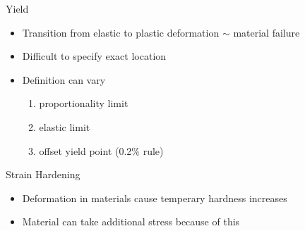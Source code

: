 \documentclass[10pt, svgnames]{beamer}
\begin{document}
\begin{frame}[label={sec:orgbc29381}]{Yield}
\begin{itemize}
\item Transition from elastic to plastic deformation \(\sim\) material
failure

\item Difficult to specify exact location

\item Definition can vary

\begin{enumerate}
\item proportionality limit

\item elastic limit

\item offset yield point (0.2\% rule)
\end{enumerate}
\end{itemize}
\end{frame}

\begin{frame}[label={sec:orgc757106}]{Strain Hardening}
\begin{itemize}
\item Deformation in materials cause temperary hardness increases

\item Material can take additional stress because of this
\end{itemize}
\end{frame}
\end{document}
